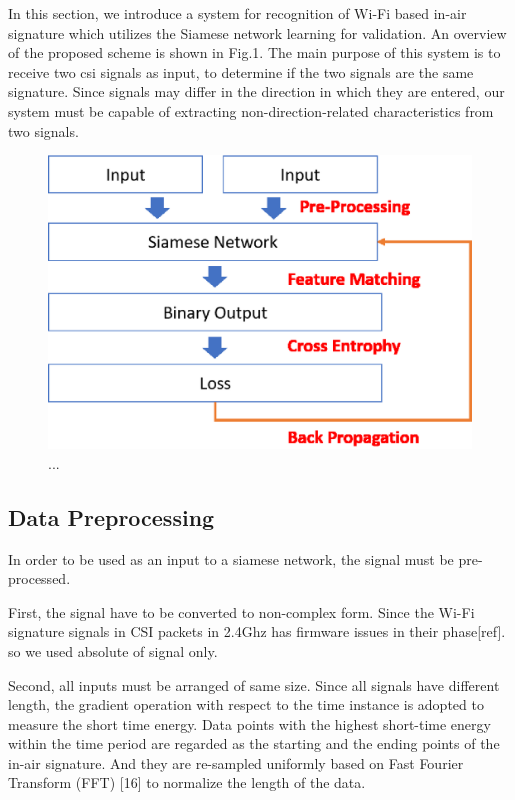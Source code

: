 \documentclass[runningheads]{llncs}
\begin{document}
In this section, we introduce a system for recognition of Wi-Fi based in-air signature which utilizes the Siamese network learning for validation.
An overview of the proposed scheme is shown in Fig.1.
The main purpose of this system is to receive two csi signals as input, to 
determine if the two signals are the same signature.
Since signals may differ in the direction in which they are entered, our system must be capable of extracting non-direction-related characteristics from two signals.
\begin{figure}
\includegraphics[width=\textwidth]{methods1.eps}
\caption{...} \label{method1}
\end{figure}


\subsection{Data Preprocessing}
In order to be used as an input to a siamese network, the signal must be pre-processed.

First, the signal have to be converted to non-complex form.
Since the Wi-Fi signature signals in CSI packets in 2.4Ghz has firmware issues in their phase[ref]. so we used absolute of signal only.

Second, all inputs must be arranged of same size.
Since all signals have different length, the gradient operation with respect to the time instance is adopted to measure the short time energy. 
Data points with the highest short-time energy within the time period are regarded as the starting and the ending points of the in-air signature.
And they are re-sampled uniformly based on Fast Fourier Transform (FFT) [16] to normalize the length of the data. 
\end{document}
